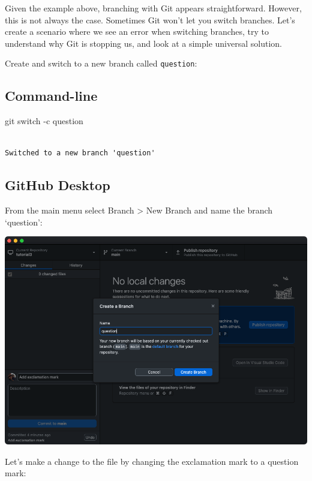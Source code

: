 \documentclass[
  letterpaper,
  DIV=11,
  numbers=noendperiod]{scrartcl}
\newenvironment{Shaded}{\begin{snugshade}}{\end{snugshade}}
\newcommand{\AttributeTok}[1]{\textcolor[rgb]{0.40,0.45,0.13}{#1}}
\newcommand{\FunctionTok}[1]{\textcolor[rgb]{0.28,0.35,0.67}{#1}}
\newcommand{\NormalTok}[1]{\textcolor[rgb]{0.00,0.23,0.31}{#1}}
\begin{document}
Given the example above, branching with Git appears straightforward.
However, this is not always the case. Sometimes Git won't let you switch
branches. Let's create a scenario where we see an error when switching
branches, try to understand why Git is stopping us, and look at a simple
universal solution.

Create and switch to a new branch called \texttt{question}:

\subsection{Command-line}

\begin{Shaded}
\begin{Highlighting}[]
\FunctionTok{git}\NormalTok{ switch }\AttributeTok{{-}c}\NormalTok{ question}
\end{Highlighting}
\end{Shaded}

\begin{verbatim}

Switched to a new branch 'question'
\end{verbatim}

\subsection{GitHub Desktop}

From the main menu select Branch \textgreater{} New Branch and name the
branch `question':

\includegraphics{images/image37.png}

Let's make a change to the file by changing the exclamation mark to a
question mark:
\end{document}
